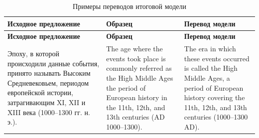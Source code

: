 \begin{longtable}{|p{}|p{}|p{}|}
	\caption{Примеры переводов итоговой модели}\label{tab:final-examples}                                                                                                                                                                                                                                                                                                                                                                                                                                                                                                                                                           \\
	\hline
	\textbf{Исходное предложение}                                                                                                                                                                                     & \textbf{Образец}                                                                                                                                                                                      & \textbf{Перевод модели}                                                                                                                                                                             \\
	\hline
	\endfirsthead
	\hline
	\textbf{Исходное предложение}                                                                                                                                                                                     & \textbf{Образец}                                                                                                                                                                                      & \textbf{Перевод модели}                                                                                                                                                                             \\
	\hline
	\endhead
	Эпоху, в которой происходили данные события, принято называть Высоким Средневековьем, периодом европейской истории, затрагивающим XI, XII и XIII века (1000--1300 гг. н. э.).                                     & The age where the events took place is commonly referred as the High Middle Ages the period of European history in the 11th, 12th, and 13th centuries (AD 1000--1300).                                & The era in which these events occurred is called the High Middle Ages, a period of European history covering the 11th, 12th, and 13th centuries (1000--1300 AD).                                    \\

\end{longtable}

